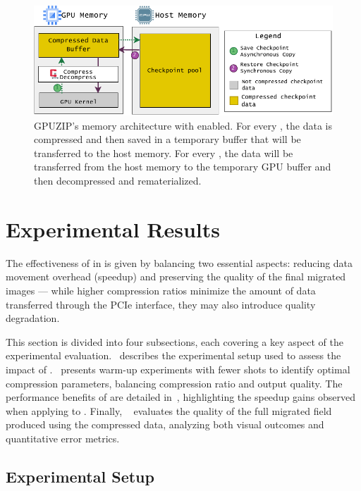 \documentclass[Ingles,Final]{ic-tese-v3}
\begin{document}
\begin{figure}[h]
  \centering
  \includegraphics[width=1\linewidth,trim={0 0 0 0},clip]{figures/comp_arch.pdf}
  \caption[Memory architecture diagram (\compression)]{GPUZIP's memory architecture with \compression enabled. For every \save, the data is compressed and then saved in a temporary buffer that will be transferred to the host memory. For every \restore, the data will be transferred from the host memory to the temporary GPU buffer and then decompressed and rematerialized.}
  \label{fig:archnew_wcomp}
\end{figure}


\section{Experimental Results}
\label{sec:comp_results}

The effectiveness of \compression in \awave is given by balancing two essential aspects: reducing data movement overhead (speedup) and preserving the quality of the final migrated images --- while higher compression ratios minimize the amount of data transferred through the PCIe interface, they may also introduce quality degradation.

This section is divided into four subsections, each covering a key aspect of the experimental evaluation.~ describes the experimental setup used to assess the impact of \compression.~ presents warm-up experiments with fewer shots to identify optimal compression parameters, balancing compression ratio and output quality. The performance benefits of \compression are detailed in~, highlighting the speedup gains observed when applying \compression to \awave. Finally, ~ evaluates the quality of the full migrated field produced using the compressed data, analyzing both visual outcomes and quantitative error metrics.

\subsection{Experimental Setup}
\label{sec:compress_exp_setup}
\end{document}
